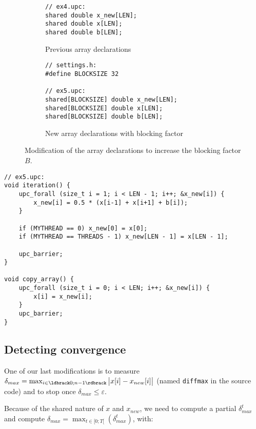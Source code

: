 \documentclass[12pt]{article}
\begin{document}
\begin{figure}[ht]
  \begin{subfigure}[b]{0.49\columnwidth}
    \begin{lstlisting}[style=C, numbers=none]
// ex4.upc:
shared double x_new[LEN];
shared double x[LEN];
shared double b[LEN];
    \end{lstlisting}
    \caption{Previous array declarations}
  \end{subfigure}
  \hfill
  \begin{subfigure}[b]{0.49\columnwidth}
    \begin{lstlisting}[style=C, numbers=none]
// settings.h:
#define BLOCKSIZE 32

// ex5.upc:
shared[BLOCKSIZE] double x_new[LEN];
shared[BLOCKSIZE] double x[LEN];
shared[BLOCKSIZE] double b[LEN];
    \end{lstlisting}
    \caption{New array declarations with blocking factor}
  \end{subfigure}
  \caption{Modification of the array declarations to increase the blocking factor $B$.}
  \label{fig:laplace45a}
\end{figure}

\begin{lstlisting}[style=C, numbers=none, caption={New \texttt{iteration()} and \texttt{copy\_array()} implementations}, label={fig:laplace45b}]
// ex5.upc:
void iteration() {
    upc_forall (size_t i = 1; i < LEN - 1; i++; &x_new[i]) {
        x_new[i] = 0.5 * (x[i-1] + x[i+1] + b[i]);
    }

    if (MYTHREAD == 0) x_new[0] = x[0];
    if (MYTHREAD == THREADS - 1) x_new[LEN - 1] = x[LEN - 1];

    upc_barrier;
}

void copy_array() {
    upc_forall (size_t i = 0; i < LEN; i++; &x_new[i]) {
        x[i] = x_new[i];
    }
    upc_barrier;
}
\end{lstlisting}

\newpage

\subsection{Detecting convergence}

One of our last modifications is to measure $\delta_{max} = \max_{i\in \ldbrack 0; n-1 \rdbrack}{\bigl\vert x[i]-x_{new}[i] \bigr\vert}$ (named \texttt{diffmax} in the source code) and to stop once $\delta_{max} \leq \varepsilon$.

Because of the shared nature of $x$ and $x_{new}$, we need to compute a partial $\delta_{max}^t$ and compute $\delta_{max} = \max_{t \in [0; T[}(\delta_{max}^t)$, with:
\end{document}
